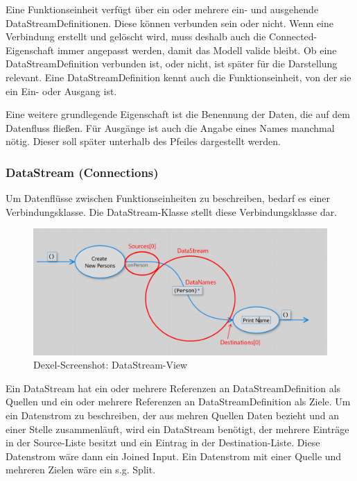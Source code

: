 	Eine Funktionseinheit verfügt über ein oder mehrere ein- und ausgehende
	DataStreamDefinitionen. Diese können verbunden sein oder nicht. Wenn eine
	Verbindung erstellt und gelöscht wird, muss deshalb auch die Connected-Eigenschaft
	immer angepasst werden, damit das Modell valide bleibt.
	Ob eine DataStreamDefinition verbunden ist, oder nicht, ist später
	für die Darstellung relevant.
	Eine DataStreamDefinition kennt auch die Funktionseinheit, von der sie ein
	Ein- oder Ausgang ist.
	
	Eine weitere grundlegende Eigenschaft ist die Benennung der Daten, die auf dem
	Datenfluss fließen. Für Ausgänge ist auch die Angabe eines
	Names manchmal nötig. Dieser soll später unterhalb des Pfeiles
	dargestellt werden.

\subsubsection{DataStream (Connections)}

Um Datenflüsse zwischen Funktionseinheiten zu beschreiben, bedarf es einer
Verbindungsklasse. Die DataStream-Klasse stellt diese Verbindungsklasse dar.



		\begin{figure}[H]
			\centering
			\includegraphics[width=0.9\linewidth]{./img/DataStreamView.png} 
			\caption{Dexel-Screenshot: DataStream-View}
		\end{figure}


Ein DataStream hat ein oder mehrere Referenzen an DataStreamDefinition als
Quellen und ein oder mehrere Referenzen an DataStreamDefinition als Ziele.
Um ein Datenstrom zu beschreiben, der aus mehren Quellen Daten bezieht und
an einer Stelle zusammenläuft, wird ein DataStream benötigt, der mehrere
Einträge in der Source-Liste besitzt und ein Eintrag in der
Destination-Liste. Diese Datenstrom wäre dann ein Joined Input.
Ein Datenstrom mit einer Quelle und mehreren Zielen wäre ein s.g. Split.

